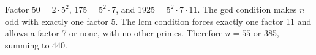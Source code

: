 Factor $ 50=2\cdot5^2 $, $ 175=5^2\cdot7 $, and $ 1925=5^2\cdot7\cdot11 $. The gcd condition makes $ n $ odd with exactly one factor 5. The lcm condition forces exactly one factor 11 and allows a factor 7 or none, with no other primes. Therefore $ n=55 $ or 385, summing to $\boxed{440}$.
